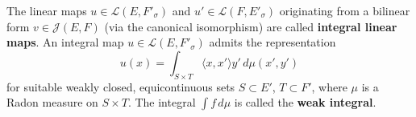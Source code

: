 The linear maps $u \in \mathcal{L}(E, F'_\sigma)$ and $u' \in \mathcal{L}(F, E'_\sigma)$ originating from a bilinear form $v \in \mathcal{J}(E, F)$ (via the canonical isomorphism) are called \textbf{integral linear maps}. An integral map $u \in \mathcal{L}(E, F'_\sigma)$ admits the representation
$$u(x) = \int_{S \times T} \langle x, x' \rangle y' \, d\mu(x', y')$$
for suitable weakly closed, equicontinuous sets $S \subset E'$, $T \subset F'$, where $\mu$ is a Radon measure on $S \times T$. The integral $\int f \, d\mu$ is called the \textbf{weak integral}.
